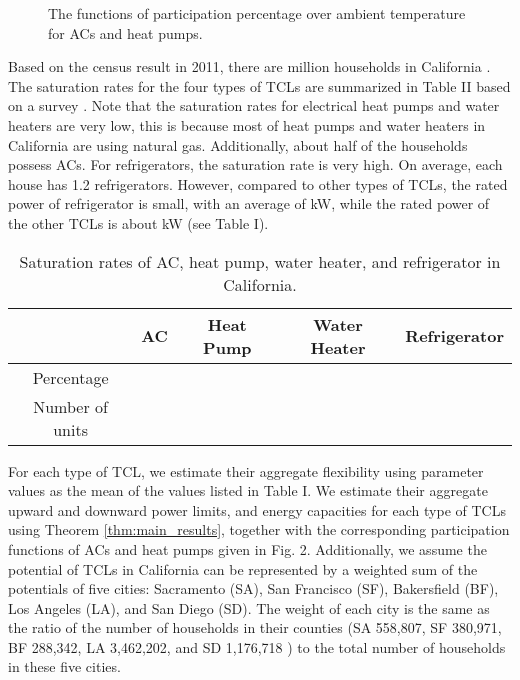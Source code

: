 \documentclass[onecolumn,journal]{IEEEtran}
\begin{document}
\begin{figure}[tb]
\centering
{}
\caption{The functions of participation percentage over ambient temperature for ACs and heat pumps. } \label{fig:participation_vs_temp}
\end{figure}

Based on the census result in 2011, there are  million households in California \cite{CA_census}. The saturation rates for the four types of \acp{TCL} are summarized in Table II based on a survey \cite{CA_applicance}. Note that the saturation rates for electrical heat pumps and water heaters are very low, this is because most of heat pumps and water heaters in California are using natural gas. Additionally, about half of the households possess ACs. For refrigerators,  the saturation rate is very high. On average, each house has 1.2 refrigerators. However, compared to other types of \acp{TCL}, the rated power of refrigerator is small, with an average of  kW, while the rated power of the other \acp{TCL} is about  kW (see Table I). 

\begin{table}[tb]
\caption{Saturation rates of AC, heat pump, water heater, and refrigerator in California.}
\label{tab:saturation}
{\scriptsize
\begin{center}
\begin{tabular}{c||c|c|c|c}
     & AC & Heat Pump &  Water Heater & Refrigerator \\
\hline \hline
{\scriptsize Percentage} & {\scriptsize } & {\scriptsize }& {\scriptsize}  & {\scriptsize } \\
{\scriptsize Number of units} & {\scriptsize } & {\scriptsize}  & {\scriptsize } & {\scriptsize }\\
\end{tabular}
\end{center}
}
\end{table}

For each type of \ac{TCL}, we estimate their aggregate flexibility using parameter values as the mean of the values listed in Table I. We estimate their aggregate upward and downward power limits, and energy capacities for each type of \acp{TCL} using Theorem \ref{thm:main_results}, together with the corresponding participation functions of ACs and heat pumps given in Fig.  2.  Additionally, we assume the potential of TCLs in California can be represented by a weighted sum of the potentials of five cities: Sacramento (SA), San Francisco (SF), Bakersfield (BF), Los Angeles (LA), and San Diego (SD). The weight of each city is the same as the ratio of the number of households in their counties (SA 558,807, SF 380,971, BF 288,342, LA 3,462,202, and SD 1,176,718 \cite{CA_census}) to the total number of households in these five cities.
\end{document}
